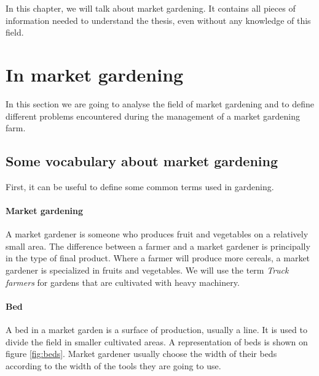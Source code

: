 
In this chapter, we will talk about market gardening. It contains all pieces of information needed to understand the thesis, even without any knowledge of this field.



\section{In market gardening}
In this section we are going to analyse the field of market gardening and to define different problems encountered during the management of a market gardening farm.

\subsection{Some vocabulary about market gardening}
First, it can be useful to define some common terms used in gardening.
\paragraph{Market gardening} A market gardener is someone who produces fruit and vegetables on a relatively small area. The difference between a farmer and a market gardener is principally in the type of final product. Where a farmer will produce more cereals, a market gardener is specialized in fruits and vegetables. We will use the term \emph{Truck farmers} for gardens that are cultivated with heavy machinery.  


\paragraph{Bed} A bed in a market garden is a surface of production, usually a line. It is used to divide the field in smaller cultivated areas. A representation of beds is shown on figure \ref{fig:beds}. Market gardener usually choose the width of their beds according to the width of the tools they are going to use.

